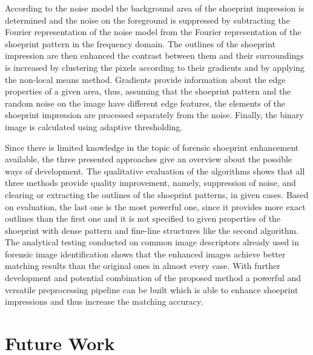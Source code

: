 \documentclass[draft,final]{vutinfth} %
\begin{document}
According to the noise model the background area of the shoeprint impression is determined and the noise on the foreground is suppressed by subtracting the Fourier representation of the noise model from the Fourier representation of the shoeprint pattern in the frequency domain.
The outlines of the shoeprint impression are then enhanced the contrast between them and their surroundings is increased by clustering the pixels according to their gradients  and by applying the non-local means method.
Gradients provide information about the edge properties of a given area, thus, assuming that the shoeprint pattern and the random noise on the image have different edge features, the elements of the shoeprint impression are processed separately from the noise.
Finally, the binary image is calculated using adaptive thresholding.
\par
Since there is limited knowledge in the topic of forensic shoeprint enhancement available, the three presented approaches give an overview about the possible ways of development.
The qualitative evaluation of the algorithms shows that all three methods provide quality improvement, namely, suppression of noise, and clearing or extracting the outlines of the shoeprint patterns, in given cases. 
Based on evaluation, the last one is the most powerful one, since it provides more exact outlines than the first one and it is not specified to given properties of the shoeprint with dense pattern and fine-line structures like the second algorithm.
The analytical testing conducted on common image descriptors already used in forensic image identification shows that the enhanced images achieve better matching results than the original ones in almost every case.
With further development and potential combination of the proposed method a powerful and versatile preprocessing pipeline can be built which is able to enhance shoeprint impressions and thus increase the matching accuracy.

\section*{Future Work}
\end{document}
